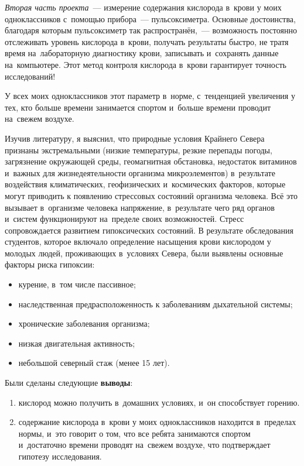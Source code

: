 \textit{Вторая часть проекта}~--- измерение содержания кислорода в~крови у моих одноклассников с~помощью прибора~--- пульсоксиметра. Основные достоинства, благодаря которым пульсоксиметр так распространён,~--- возможность постоянно отслеживать уровень кислорода в~крови, получать результаты быстро, не тратя время на~лабораторную диагностику крови, записывать и~сохранять данные на~компьютере. Этот метод контроля кислорода в~крови гарантирует точность исследований!

У всех моих одноклассников этот параметр в~норме, с~тенденцией увеличения у тех, кто больше времени занимается спортом и~больше времени проводит на~свежем воздухе.

Изучив литературу, я выяснил, что природные условия Крайнего Севера признаны экстремальными (низкие температуры, резкие перепады погоды, загрязнение окружающей среды, геомагнитная обстановка, недостаток витаминов и~важных для жизнедеятельности организма микроэлементов) в~результате воздействия климатических, геофизических и~космических факторов, которые могут приводить к появлению стрессовых состояний организма человека. Всё это вызывает в~организме человека напряжение, в~результате чего ряд органов и~систем функционируют на~пределе своих возможностей. Стресс сопровождается развитием гипоксических состояний. В результате обследования студентов, которое включало определение насыщения крови кислородом у молодых людей, проживающих в~условиях Севера, были выявлены основные факторы риска гипоксии:
\begin{itemize}[noitemsep]\vspace{-8pt}
  \item курение, в~том числе пассивное;
  \item наследственная предрасположенность к заболеваниям дыхательной системы;
  \item хронические заболевания организма;
  \item низкая двигательная активность;
  \item небольшой северный стаж (менее 15 лет).
\end{itemize}\vspace{-8pt}

Были сделаны следующие \textbf{выводы}:
\begin{enumerate}[noitemsep]\vspace{-8pt}
\item кислород можно получить в~домашних условиях, и~он способствует горению.
\item содержание кислорода в~крови у моих одноклассников находится в~пределах нормы, и~это говорит о том, что все ребята занимаются спортом и~достаточно времени проводят на~свежем воздухе, что подтверждает гипотезу исследования.
\end{enumerate}\vspace{-8pt}

